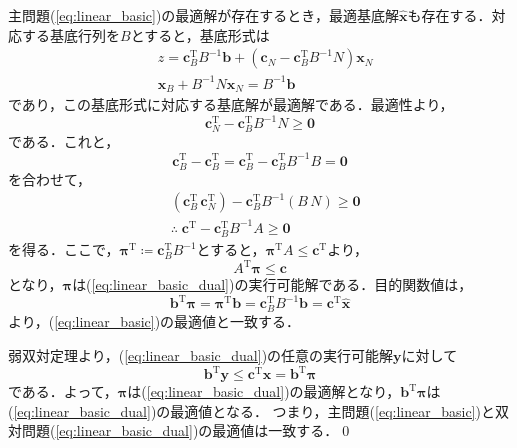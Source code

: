 \documentclass{jsreport}
\begin{document}
主問題(\ref{eq:linear_basic})の最適解が存在するとき，最適基底解$\hat{\bm{x}}$も存在する．対応する基底行列を$B$とすると，基底形式は
\begin{align}
  &z = \bm{c}_B^{\mathrm{T}} B^{-1} \bm{b} + (\bm{c}_N - \bm{c}_B^{\mathrm{T}} B^{-1} N) \bm{x}_N \nonumber \\
  &\bm{x}_B + B^{-1} N \bm{x}_N = B^{-1} \bm{b} \nonumber
\end{align}
であり，この基底形式に対応する基底解が最適解である．最適性より，
\begin{equation}
  \bm{c}_N^{\mathrm{T}} - \bm{c}_B^{\mathrm{T}} B^{-1} N \geq \bm{0} \nonumber
\end{equation}
である．これと，
\begin{equation}
  \bm{c}_B^{\mathrm{T}} - \bm{c}_B^{\mathrm{T}} = \bm{c}_B^{\mathrm{T}} - \bm{c}_B^{\mathrm{T}}B^{-1}B = \bm{0} \nonumber
\end{equation}
を合わせて，
\begin{align}
  &(\bm{c}_B^{\mathrm{T}} \, \bm{c}_N^{\mathrm{T}}) - \bm{c}_B^{\mathrm{T}} B^{-1} (B \, N) \geq \bm{0} \nonumber \\
  &\therefore \; \bm{c}^{\mathrm{T}} - \bm{c}_B^{\mathrm{T}} B^{-1} A \geq \bm{0} \nonumber
\end{align}
を得る．ここで，$\bm{\pi}^{\mathrm{T}} \coloneqq \bm{c}_B^{\mathrm{T}}B^{-1}$とすると，$\bm{\pi}^{\mathrm{T}}A \leq \bm{c}^{\mathrm{T}}$より，
\begin{equation}
  A^{\mathrm{T}} \bm{\pi} \leq \bm{c} \nonumber
\end{equation}
となり，$\bm{\pi}$は(\ref{eq:linear_basic_dual})の実行可能解である．目的関数値は，
\begin{equation}
  \bm{b}^{\mathrm{T}}\bm{\pi} = \bm{\pi}^{\mathrm{T}}\bm{b}
  = \bm{c}_B^{\mathrm{T}}B^{-1}\bm{b} = \bm{c}^{\mathrm{T}}\hat{\bm{x}} \nonumber
\end{equation}
より，(\ref{eq:linear_basic})の最適値と一致する．

弱双対定理より，(\ref{eq:linear_basic_dual})の任意の実行可能解$\bm{y}$に対して
\begin{equation}
  \bm{b}^{\mathrm{T}}\bm{y} \leq \bm{c}^{\mathrm{T}}\hat{\bm{x}} = \bm{b}^{\mathrm{T}}\bm{\pi} \nonumber
\end{equation}
である．よって，$\bm{\pi}$は(\ref{eq:linear_basic_dual})の最適解となり，$\bm{b}^{\mathrm{T}}\bm{\pi}$は(\ref{eq:linear_basic_dual})の最適値となる．
つまり，主問題(\ref{eq:linear_basic})と双対問題(\ref{eq:linear_basic_dual})の最適値は一致する．\qed
\end{document}
